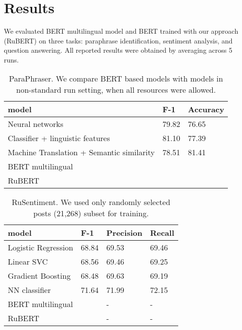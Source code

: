\documentclass{article}
\begin{document}
\section{Results}
We evaluated BERT multilingual model and BERT trained with our approach (RuBERT) on three tasks: paraphrase identification, sentiment analysis, and question answering. All reported results were obtained by averaging across 5 runs.

\begin{table}[!ht]
\centering
\begin{tabular}{l|l|l}
\hline
model                            & F-1   & Accuracy \\ \hline
Neural networks \cite{pivovarova2017paraphraser}  & 79.82 & 76.65    \\ \hline
Classifier + linguistic features \cite{pivovarova2017paraphraser} & 81.10 & 77.39    \\ \hline
Machine Translation + Semantic similarity \cite{kravchenko2017paraphrase} & 78.51 & 81.41    \\ \hline\hline
BERT multilingual                &  &     \\ \hline
RuBERT                           &  &     \\ \hline
\end{tabular}
\caption{ParaPhraser. We compare BERT based models with models in non-standard run setting, when all resources were allowed.}
\label{tab:paraphraser}
\end{table}

\begin{table}[ht!]
\centering
\begin{tabular}{l|l|l|l}
\hline
model               & F-1   & Precision & Recall \\ \hline
Logistic Regression \cite{rogers2018rusentiment} & 68.84 & 69.53     & 69.46  \\ \hline
Linear SVC \cite{rogers2018rusentiment}         & 68.56 & 69.46     & 69.25  \\ \hline
Gradient Boosting \cite{rogers2018rusentiment}   & 68.48 & 69.63     & 69.19  \\ \hline
NN classifier \cite{rogers2018rusentiment}       & 71.64 & 71.99     & 72.15  \\ \hline \hline
BERT multilingual   &  & -         & -      \\ \hline
RuBERT              &  & -         & -      \\ \hline
\end{tabular}
\caption{RuSentiment. We used only randomly selected posts (21,268) subset for training.}
\label{tab:rusentiment}
\end{table}
\end{document}
